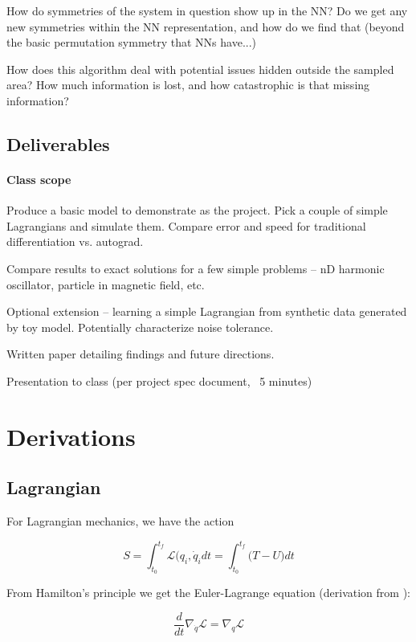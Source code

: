 \documentclass[]{article}
\begin{document}
How do symmetries of the system in question show up in the NN? Do we get any new symmetries within the NN representation, and how do we find that (beyond the basic permutation symmetry that NNs have...)

How does this algorithm deal with potential issues hidden outside the sampled area? How much information is lost, and how catastrophic is that missing information? 


\subsection{Deliverables}
\paragraph{Class scope}
Produce a basic model to demonstrate as the project. Pick a couple of simple Lagrangians and simulate them. Compare error and speed for traditional differentiation vs. autograd.

Compare results to exact solutions for a few simple problems -- nD harmonic oscillator, particle in magnetic field, etc.

Optional extension -- learning a simple Lagrangian from synthetic data generated by toy model. Potentially characterize noise tolerance.

Written paper detailing findings and future directions.



Presentation to class (per project spec document, ~5 minutes)


\section{Derivations}
\subsection{Lagrangian}

For Lagrangian mechanics\cite{Taylor}, we have the action

\begin{equation}
	S = \int_{t_0}^{t_f} \mathcal{L} (q_i,\dot{q}_i dt = \int_{t_0}^{t_f} \big(  T-U \big)dt
\end{equation}

From Hamilton's principle we get the Euler-Lagrange equation (derivation from \cite{Cranmer}):

\begin{equation}
	\frac{d}{dt}\nabla_{\dot{q}} \mathcal{L}= \nabla_{q} \mathcal{L}
\end{equation}
\end{document}
